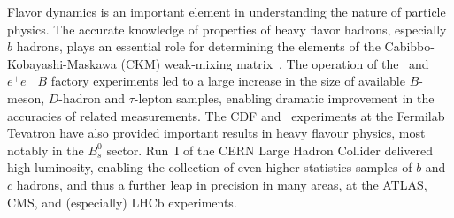 %

\label{sec:intro}

Flavor dynamics is an important element in understanding the nature of
particle physics.  The accurate knowledge of properties of heavy flavor
hadrons, especially $b$ hadrons, plays an essential role for
determining the elements of the Cabibbo-Kobayashi-Maskawa (CKM)
weak-mixing matrix~\cite{Cabibbo:1963yz,Kobayashi:1973fv}. 
The operation of the \belle\ and \babar\ $e^+e^-$ $B$ factory 
experiments led to a large increase in the size of available 
$B$-meson, $D$-hadron and $\tau$-lepton samples, 
enabling dramatic improvement in the accuracies of related measurements.
The CDF and \dzero\ experiments at the Fermilab Tevatron 
have also provided important results in heavy flavour physics,
most notably in the $B^0_s$ sector.
Run~I of the CERN Large Hadron Collider delivered high luminosity, 
enabling the collection of even higher statistics samples of $b$ 
and $c$ hadrons, and thus a further leap in precision in many areas, at the
ATLAS, CMS, and (especially) LHCb experiments. 
 
